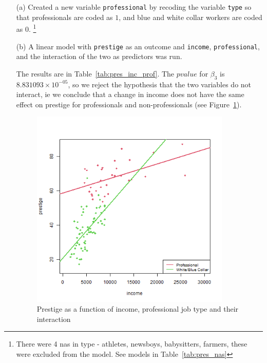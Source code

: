 \documentclass[12pt,letterpaper]{article}
\begin{document}
\begin{enumerate}
	
	\item [(a)]
	Created a new variable \texttt{professional} by recoding the variable \texttt{type} so that professionals are coded as $1$, and blue and white collar workers are coded as $0$.
	\footnote{There were 4 nas in type - athletes, newsboys, babysitters, farmers, these were excluded from the model.  See models in Table~\ref{tab:pres_nas}}
	 
	
	\item [(b)]
	A linear model with \texttt{prestige} as an outcome and \texttt{income}, \texttt{professional}, and the interaction of the two as predictors was run.%

	 

	  The results are in Table~\ref{tab:pres_inc_prof}.    The $pvalue$ for $\beta_3$ is $8.831093\times 10^{-05}$, so we reject the hypothesis that the two variables do not interact, ie we conclude that a change in income does not have the same effect on prestige for professionals and non-professionals (see Figure~\ref{fig:pres_inc_prof}).
	  
	  
	    \begin{figure}
		    \includegraphics[width=0.9\textwidth]{Graphics/prestige_interaction.png}
		    \caption{Prestige as a function of income, professional job type and their interaction}
		    \label{fig:pres_inc_prof}
	    \end{figure}


\end{enumerate}
\end{document}
